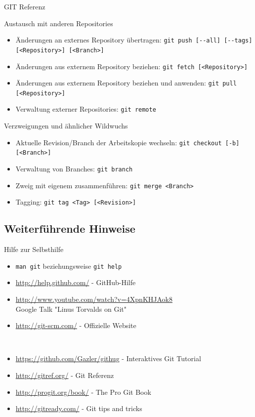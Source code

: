 \begin{frame}{GIT Referenz}
\begin{block}{Austausch mit anderen Repositories}
		\begin{itemize}
			\item Änderungen an externes Repository übertragen: \verb|git push [--all] [--tags] [<Repository>] [<Branch>]|
			\item Änderungen aus externem Repository beziehen: \verb|git fetch [<Repository>]|
			\item Änderungen aus externem Repository beziehen und anwenden: \verb|git pull [<Repository>]|
			\item Verwaltung externer Repositories: \verb|git remote|
		\end{itemize}
	\end{block}
	\begin{block}{Verzweigungen und ähnlicher Wildwuchs}
		\begin{itemize}
			\item Aktuelle Revision/Branch der Arbeitskopie wechseln: \verb|git checkout [-b] [<Branch>]|
			\item Verwaltung von Branches: \verb|git branch|
			\item Zweig mit eigenem zusammenführen: \verb|git merge <Branch>|
			\item Tagging: \verb|git tag <Tag> [<Revision>]|
		\end{itemize}
	\end{block}
\end{frame}

\subsection{Weiterführende Hinweise}
\begin{frame}[fragile]{Hilfe zur Selbsthilfe}
	\begin{itemize}
		\item \verb|man git| beziehungsweise \verb|git help|
		\item \url{http://help.github.com/} - GitHub-Hilfe
		\item \url{http://www.youtube.com/watch?v=4XpnKHJAok8} \\
			Google Talk "Linus Torvalds on Git"
		\item \url{http://git-scm.com/} - Offizielle Website
	\end{itemize}
\ \\

\tiny
	\begin{itemize}
		\item \url{https://github.com/Gazler/githug} - Interaktives Git Tutorial
		\item \url{http://gitref.org/} - Git Referenz
		\item \url{http://progit.org/book/} - The Pro Git Book
		\item \url{http://gitready.com/} - Git tips and tricks
	\end{itemize}
\end{frame}

